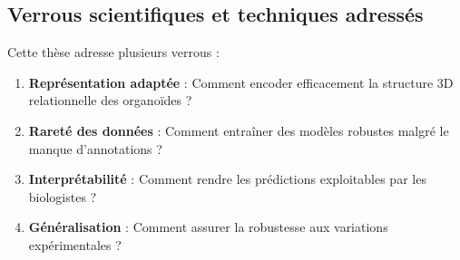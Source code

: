 \subsection{Verrous scientifiques et techniques adressés}

Cette thèse adresse plusieurs verrous :
\begin{enumerate}
    \item \textbf{Représentation adaptée} : Comment encoder efficacement la structure 3D relationnelle des organoïdes ?
    \item \textbf{Rareté des données} : Comment entraîner des modèles robustes malgré le manque d'annotations ?
    \item \textbf{Interprétabilité} : Comment rendre les prédictions exploitables par les biologistes ?
    \item \textbf{Généralisation} : Comment assurer la robustesse aux variations expérimentales ?
\end{enumerate}
